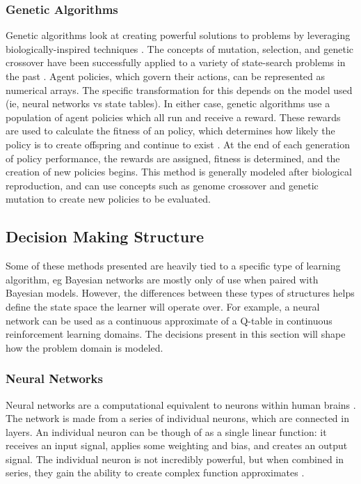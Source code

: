 \documentclass[draftclsnofoot,onecolumn,letterpaper,10pt]{IEEEtran}
\begin{document}
\subsubsection{Genetic Algorithms}
Genetic algorithms look at creating powerful solutions to problems by leveraging biologically-inspired techniques \cite{RussellNorvig}.
The concepts of mutation, selection, and genetic crossover have been successfully applied to a variety of state-search problems in the past \cite{RussellNorvig}.
Agent policies, which govern their actions, can be represented as numerical arrays.
The specific transformation for this depends on the model used (ie, neural networks vs state tables).
In either case, genetic algorithms use a population of agent policies which all run and receive a reward.
These rewards are used to calculate the fitness of an policy, which determines how likely the policy is to create offspring and continue to exist \cite{RussellNorvig}.
At the end of each generation of policy performance, the rewards are assigned, fitness is determined, and the creation of new policies begins.
This method is generally modeled after biological reproduction, and can use concepts such as genome crossover and genetic mutation to create new policies to be evaluated.

\subsection{Decision Making Structure}
Some of these methods presented are heavily tied to a specific type of learning algorithm, eg Bayesian networks are mostly only of use when paired with Bayesian models.
However, the differences between these types of structures helps define the state space the learner will operate over.
For example, a neural network can be used as a continuous approximate of a Q-table in continuous reinforcement learning domains.
The decisions present in this section will shape how the problem domain is modeled.

\subsubsection{Neural Networks}
Neural networks are a computational equivalent to neurons within human brains \cite{SuttonBarto}.
The network is made from a series of individual neurons, which are connected in layers.
An individual neuron can be though of as a single linear function: it receives an input signal, applies some weighting and bias, and creates an output signal.
The individual neuron is not incredibly powerful, but when combined in series, they gain the ability to create complex function approximates \cite{SuttonBarto}.
\end{document}
